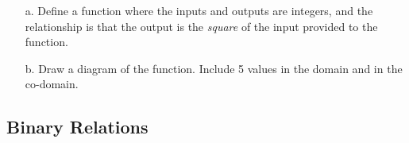\documentclass[a4paper,12pt]{book}
\newcounter{question}
\begin{document}
    \begin{questionNOGRADE}{\thequestion}

        \begin{enumerate}
            \item[a.] Define a function where the inputs and outputs are integers,
                and the relationship is that the output is the \textit{square} of the input
                provided to the function.


            \item[b.] Draw a diagram of the function. Include 5 values in the
                domain and in the co-domain.
        \end{enumerate}

    \end{questionNOGRADE}

    \notonkey{ \newpage }{ \hrulefill }

    \subsection{Binary Relations}
\end{document}

